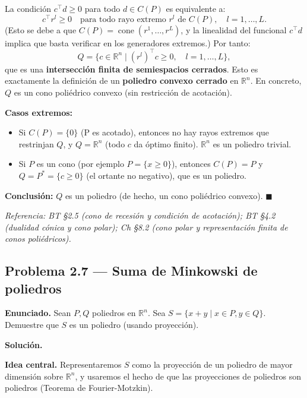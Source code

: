 \documentclass{article}
\begin{document}
La condición $c^\top d \geq 0$ para todo $d \in C(P)$ es equivalente a:
\[
c^\top r^l \geq 0 \quad \text{para todo rayo extremo } r^l \text{ de } C(P), \quad l = 1, \ldots, L.
\]
(Esto se debe a que $C(P) = \operatorname{cone}(r^1, \ldots, r^L)$, y la linealidad del funcional $c^\top d$ implica que basta verificar en los generadores extremos.) Por tanto:
\[
Q = \{c \in \mathbb{R}^n \mid (r^l)^\top c \geq 0, \quad l = 1, \ldots, L\},
\]
que es una \textbf{intersección finita de semiespacios cerrados}. Esto es exactamente la definición de un \textbf{poliedro convexo cerrado} en $\mathbb{R}^n$. En concreto, $Q$ es un cono poliédrico convexo (sin restricción de acotación).

\textbf{Casos extremos:}
\begin{itemize}
\item Si $C(P) = \{0\}$ (P es acotado), entonces no hay rayos extremos que restrinjan $Q$, y $Q = \mathbb{R}^n$ (todo $c$ da óptimo finito). $\mathbb{R}^n$ es un poliedro trivial. \checkmark
\item Si $P$ es un cono (por ejemplo $P = \{x \geq 0\}$), entonces $C(P) = P$ y $Q = P^* = \{c \geq 0\}$ (el ortante no negativo), que es un poliedro. \checkmark
\end{itemize}

\textbf{Conclusión:} $Q$ es un poliedro (de hecho, un cono poliédrico convexo). $\blacksquare$

\medskip\noindent\textit{Referencia: BT §2.5 (cono de recesión y condición de acotación); BT §4.2 (dualidad cónica y cono polar); Ch §8.2 (cono polar y representación finita de conos poliédricos).}

\newpage
\subsection*{Problema 2.7 — Suma de Minkowski de poliedros}

\textbf{Enunciado.} Sean $P, Q$ poliedros en $\mathbb{R}^n$. Sea $S = \{x + y \mid x \in P, y \in Q\}$. Demuestre que $S$ es un poliedro (usando proyección).

\medskip
\noindent\textbf{Solución.}

\textbf{Idea central.} Representaremos $S$ como la proyección de un poliedro de mayor dimensión sobre $\mathbb{R}^n$, y usaremos el hecho de que las proyecciones de poliedros son poliedros (Teorema de Fourier-Motzkin).
\end{document}
